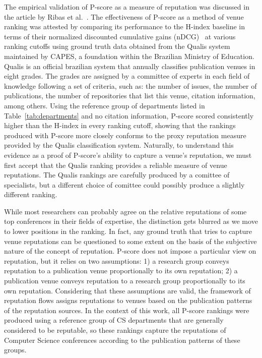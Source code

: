 \documentclass[notitlepage]{svjour3}
\begin{document}
The empirical validation of P-score as a measure of reputation was discussed in the 
article by Ribas et al.~\cite{Ribas2015}.
The effectiveness of P-score as a method of venue ranking was attested by comparing its
performance to the H-index baseline in terms of their normalized discounted cumulative 
gains (nDCG)~\cite{Jarvelin2002} at various ranking cutoffs using ground truth 
data obtained from the Qualis system maintained by CAPES, 
a foundation within the Brazilian Ministry of Education. Qualis is an official
brazilian system that annually classifies publication venues in eight grades. %
The grades are assigned by a committee of experts in each field of knowledge 
following a set of criteria, such as: the number of issues, the number of publications, 
the number of repositories that list this venue, citation information, among others.
Using the reference group of departments listed in Table~\ref{tab:departments} and
no citation information, P-score scored consistently higher than the H-index in every 
ranking cutoff, showing that the rankings produced with P-score more closely
conforms to the proxy reputation measure provided by the Qualis classification system.
Naturally, to understand this evidence as a proof of P-score's ability to capture a
venue's reputation, we must first accept that the Qualis ranking provides a reliable 
measure of venue reputations. The Qualis rankings are carefully produced by a
comittee of specialists, but a different choice of comittee could possibly produce
a slightly different ranking. 

While most researchers can probably agree on the relative reputations of some top conferences 
in their fields of expertise, the distinction gets blurred as we move to lower positions in the
ranking. In fact, any ground truth that tries to capture venue reputations can be questioned 
to some extent on the basis of the subjective nature of the concept of reputation. 
P-score does not impose a particular view on reputation, but it relies on two assumptions: 
1) a research group conveys reputation to a publication venue proportionally
to its own reputation; 2) a publication venue conveys reputation to a research group proportionally 
to its own reputation. Considering that these assumptions are valid, the framework of reputation flows 
assigns reputations to venues based on the publication patterns of the reputation sources. 
In the context of this work, all P-score rankings were produced using a reference group 
of CS departments that are generally considered to be reputable, so these rankings capture
the reputations of Computer Science conferences according to the publication patterns of these 
groups.
\end{document}
